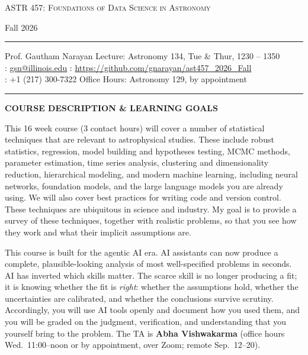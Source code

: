 

\vspace{-20em}
\centerline{\fontsize{22}{22}\selectfont\scshape  ASTR 457: Foundations of Data Science in Astronomy}
\vskip -2pt
\centerline{\headerfont Fall 2026}
\vskip -12pt
{\rule{\textwidth}{1pt}}

\vskip -10pt
Prof. Gautham Narayan                      \hfill Lecture: Astronomy 134, Tue \& Thur, 1230 -- 1350\\
\Letter: \href{mailto:gsn@illinois.edu}{gsn@illinois.edu} \hfill \Mundus: \url{https://github.com/gnarayan/ast457_2026_Fall}\\
\Telefon: +1 (217) 300-7322 \hfill Office Hours: Astronomy 129, by appointment \\
{\rule{\textwidth}{1pt}}
\vskip 7pt

{\large \bf \headerfont \color{RoyalBlue} COURSE DESCRIPTION \& LEARNING GOALS}

This 16 week course (3 contact hours) will cover a number of statistical
techniques that are relevant to astrophysical studies. These include robust
statistics, regression, model building and hypotheses testing, MCMC methods,
parameter estimation, time series analysis, clustering and dimensionality
reduction, hierarchical modeling, and modern machine learning, including
neural networks, foundation models, and the large language models you are
already using. We will also cover best practices for writing code and version
control. These techniques are ubiquitous in science and industry. My goal is to
provide a survey of these techniques, together with realistic problems, so that
you see how they work and what their implicit assumptions are.

This course is built for the agentic AI era. AI
assistants can now produce a complete, plausible-looking analysis of most
well-specified problems in seconds. AI has inverted which skills matter. The scarce skill is no longer
producing a fit; it is knowing whether the fit is \emph{right}: whether the
assumptions hold, whether the uncertainties are calibrated, and whether the
conclusions survive scrutiny. Accordingly, you will use AI tools openly and
document how you used them, and you will be graded on the judgment, verification,
and understanding that you yourself bring to the problem. The TA is
{\color{RoyalBlue} \textbf{Abha Vishwakarma}} (office hours Wed.\
11:00--noon or by appointment, over Zoom; remote Sep.~12--20).

